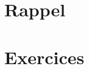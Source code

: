 \documentclass [a4paper, 11pt] {article}
\begin{document}
    \makeseancetitle
    \thispagestyle{firstpage}
    
    \part*{Rappel}
    
    \pagebreak
    \pagestyle{nextpages}
    \part*{Exercices}
    
    \begin{exercice}[Calculs]{1}
    \end{exercice}
    
    \begin{reponse}
    
    \end{reponse}
    
\end{document}
